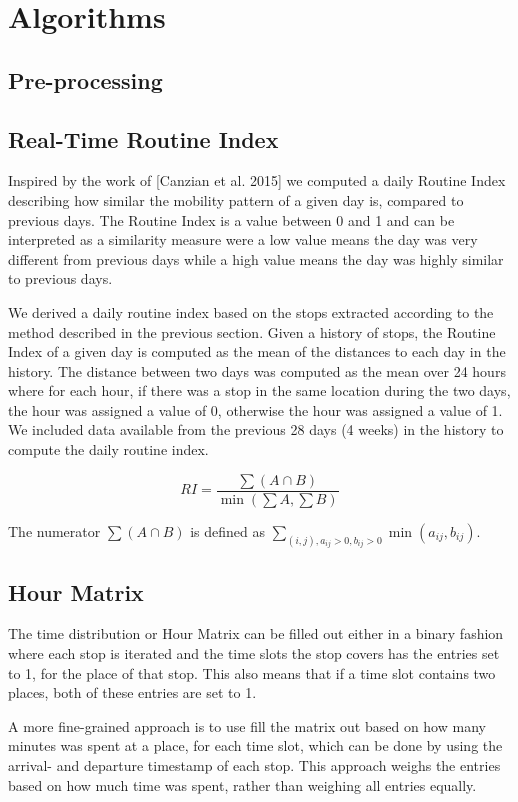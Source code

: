 \section{Algorithms}

\subsection{Pre-processing}


\subsection{Real-Time Routine Index}
Inspired by the work of [Canzian et al. 2015] we computed a daily Routine Index describing how similar the mobility pattern of a given day is, compared to previous days. The Routine Index is a value between 0 and 1 and can be interpreted as a similarity measure were a low value means the day was very different from previous days while a high value means the day was highly similar to previous days.

We derived a daily routine index based on the stops extracted according to the method described in the previous section. Given a history of stops, the Routine Index of a given day is computed as the mean of the distances to each day in the history. The distance between two days was computed as the mean over 24 hours where for each hour, if there was a stop in the same location during the two days, the hour was assigned a value of 0, otherwise the hour was assigned a value of 1. We included data available from the previous 28 days (4 weeks) in the history to compute the daily routine index.

$$RI = \frac{\sum (A \cap B)}{\min (\sum A, \sum B)}$$

The numerator $\sum (A \cap B)$ is defined as $\sum_{(i,j) , a_{ij}> 0, b_{ij} > 0} \min (a_{ij}, b_{ij})$.

\subsection{Hour Matrix}
The time distribution or Hour Matrix can be filled out either in a binary fashion where each stop is iterated and the time slots the stop covers has the entries set to 1, for the place of that stop. This also means that if a time slot contains two places, both of these entries are set to 1.

A more fine-grained approach is to use fill the matrix out based on how many minutes was spent at a place, for each time slot, which can be done by using the arrival- and departure timestamp of each stop. This approach weighs the entries based on how much time was spent, rather than weighing all entries equally.

